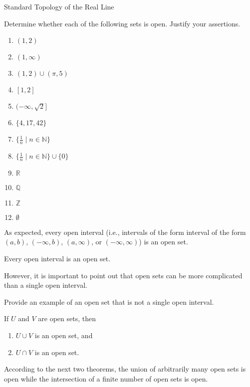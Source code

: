 \begin{section}{Standard Topology of the Real Line}
\begin{problem}\label{prob:open or not}
Determine whether each of the following sets is open. Justify your assertions.
\begin{multicols}{2}
\begin{enumerate}[label=\textrm{(\alph*)}]
\item $(1,2)$
\item $(1,\infty)$
\item $(1,2)\cup (\pi,5)$
\item $[1,2]$
\item $(-\infty,\sqrt{2}]$
\item $\{4,17,42\}$
\item $\{\frac{1}{n}\mid n\in \mathbb{N}\}$
\item $\{\frac{1}{n}\mid n\in \mathbb{N}\}\cup \{0\}$
\item $\mathbb{R}$
\item $\mathbb{Q}$
\item $\mathbb{Z}$
\item $\emptyset$
\end{enumerate}
\end{multicols}
\end{problem}

As expected, every open interval (i.e., intervals of the form interval of the form $(a,b)$, $(-\infty,b)$, $(a,\infty)$, or $(-\infty,\infty)$) is an open set. 

\begin{theorem}
Every open interval is an open set. 
\end{theorem}

However, it is important to point out that open sets can be more complicated than a single open interval.

\begin{problem}
Provide an example of an open set that is not a single open interval.
\end{problem}

\begin{theorem}\label{thm:finite union and intersection of open sets}
If $U$ and $V$ are open sets, then 
\begin{enumerate}[label=\textrm{(\alph*)}]
\item $U\cup V$ is an open set, and
\item $U\cap V$ is an open set.
\end{enumerate}
\end{theorem}

According to the next two theorems, the union of arbitrarily many open sets is open while the intersection of a finite number of open sets is open.


\end{section}
